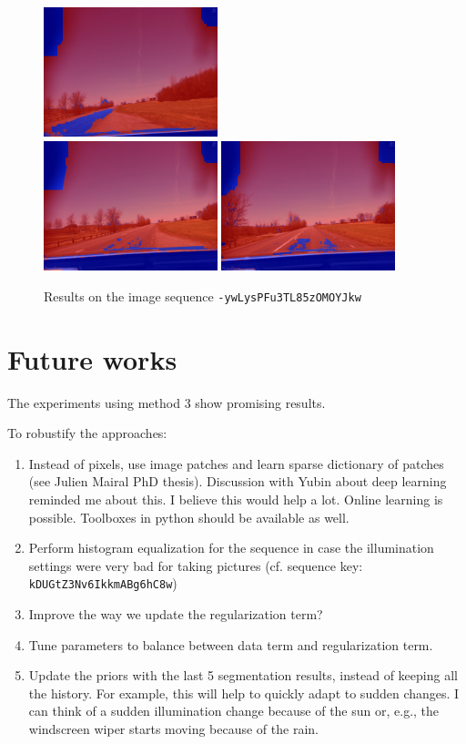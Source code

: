 \documentclass[a4paper,twoside,10pt]{article}
\begin{document}
\begin{figure}
  \includegraphics[width=0.45\textwidth]{result_11.png}
  \\
  \includegraphics[width=0.45\textwidth]{result_13.png}
  \includegraphics[width=0.45\textwidth]{result_15.png}
  \caption{Results on the image sequence \texttt{-ywLysPFu3TL85zOMOYJkw}}
	\label{fig:results}
\end{figure}



\section{Future works}
The experiments using method 3 show promising results.

To robustify the approaches:
\begin{enumerate}
\item Instead of pixels, use image patches and learn sparse dictionary of patches (see Julien Mairal PhD thesis). Discussion with Yubin about deep learning reminded me about this. I believe this would help a lot. Online learning is possible. Toolboxes in python should be available as well.
\item Perform histogram equalization for the sequence in case the illumination settings were very bad for taking pictures (cf. sequence key: \texttt{kDUGtZ3Nv6IkkmABg6hC8w})
\item Improve the way we update the regularization term?
\item Tune parameters to balance between data term and regularization term.
\item Update the priors with the last 5 segmentation results, instead of keeping all the history. For example, this will help to quickly adapt to sudden changes. I can think of a sudden illumination change because of the sun or, e.g., the windscreen wiper starts moving because of the rain.
\end{enumerate}
\end{document}
